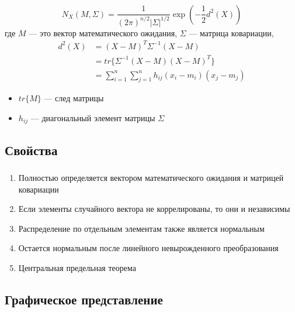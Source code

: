 \documentclass{beamer}
\begin{document}
\begin{frame}
  \frametitle{\insertsection}
  \framesubtitle{\insertsubsection}

  \begin{equation*}
    N_X(M, \Sigma) = \frac{1}{(2 \pi )^{n/2} | \Sigma |^{1/2} }
    \exp(-\frac{1}{2} d^2(X))
  \end{equation*}
  где $M$ --- это вектор математического ожидания, $\Sigma$ --- матрица ковариации, \pause
  \begin{align*}
    d^2(X) &= (X - M)^T \Sigma^{-1} (X - M)\\
           &= tr\{\Sigma^{-1} (X - M)(X - M)^T\}\\
           &=\sum_{i = 1}^{n}\sum_{j = 1}^{n} h_{ij}(x_i - m_i)(x_j - m_j)
  \end{align*}

  \begin{itemize}
    \item $tr\{M\}$ --- след матрицы
    \item $h_{ij}$ --- диагональный элемент матрицы $\Sigma$
  \end{itemize}

\end{frame}

\subsection{Свойства}

\begin{frame}
  \frametitle{\insertsection}
  \framesubtitle{\insertsubsection}

  \begin{enumerate}
    \item Полностью определяется вектором математического ожидания и матрицей ковариации \pause
    \item Если элементы случайного вектора не коррелированы, то они и независимы \pause
    \item Распределение по отдельным элементам также является нормальным \pause
    \item Остается нормальным после линейного невырожденного преобразования \pause
    \item Центральная предельная теорема
  \end{enumerate}

\end{frame}

\subsection{Графическое представление}
\end{document}
